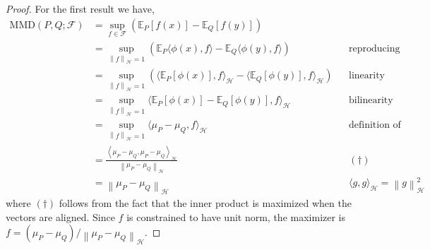 \documentclass[12pt]{article}
\newcommand*{\norm}[1]{\left\lVert#1\right\rVert}
\newcommand{\E}{\mathbb{E}}
\newcommand{\featureMap}{\phi}
\newcommand{\RKHS}{\mathcal{H}}
\newcommand{\meanEmb}[1]{\mu_{#1}}
\newcommand{\MMD}{\text{MMD}}
\newcommand{\MMDSpace}{\mathcal{F}}
\begin{document}
\begin{proof}
For the first result we have, 
\begin{align*}
\MMD(P, Q; \MMDSpace) 
&= \sup_{f \in \MMDSpace} \left(\E_P[f(x)] - \E_Q[f(y)]\right) \\
&= \sup_{\norm{f}_{\RKHS} = 1} \left(\E_P \langle \featureMap(x), f \rangle - \E_Q \langle \featureMap(y), f \rangle\right) &&\text{reproducing property} \\
&= \sup_{\norm{f}_{\RKHS} = 1} \left(\langle \E_P [\featureMap(x)], f \rangle_{\RKHS} - \langle \E_Q [\featureMap(y)], f \rangle_{\RKHS} \right) &&\text{linearity} \\
&= \sup_{\norm{f}_{\RKHS} = 1} \langle \E_P [\featureMap(x)] - \E_Q [\featureMap(y)], f \rangle_{\RKHS}  &&\text{bilinearity} \\
&= \sup_{\norm{f}_{\RKHS} = 1} \langle \meanEmb{P} - \meanEmb{Q}, f \rangle_{\RKHS}  &&\text{definition of mean embedding} \\
&= \frac{\left\langle \meanEmb{P} - \meanEmb{Q},  \meanEmb{P} - \meanEmb{Q} \right\rangle_{\RKHS}}{\norm{ \meanEmb{P} - \meanEmb{Q}}_{\RKHS}}  &&(\dagger) \\
&= \norm{ \meanEmb{P} - \meanEmb{Q}}_{\RKHS} &&\langle g, g \rangle_{\RKHS} = \norm{g}^2_{\RKHS}
\end{align*}
where $(\dagger)$ follows from the fact that the inner product is maximized when the vectors are aligned. Since $f$ is constrained to have unit norm, the 
maximizer is $f = (\meanEmb{P} - \meanEmb{Q}) / \norm{\meanEmb{P} - \meanEmb{Q}}_{\RKHS}$.


\end{proof}
\end{document}
